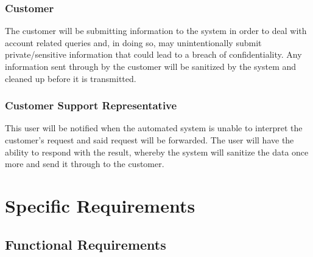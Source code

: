 \documentclass[11pt]{article}
\begin{document}
\subsubsection{Customer}
The customer will be submitting information to the system in order to deal with account related queries and, in doing so, may unintentionally submit private/sensitive information that could lead to a breach of confidentiality. Any information sent through by the customer will be sanitized by the system and cleaned up before it is transmitted.

\subsubsection{Customer Support Representative}
This user will be notified when the automated system is unable to interpret the customer's request and said request will be forwarded. The user will have the ability to respond with the result, whereby the system will sanitize the data once more and send it through to the customer.

\section{Specific Requirements}

\subsection{Functional Requirements} %
\end{document}
